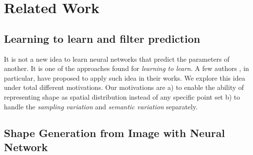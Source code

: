 \section{Related Work}
\subsection{Learning to learn and filter prediction}
It is not a new idea to learn neural networks that predict the parameters of another. It is one of the approaches found for \textit{learning to learn}.  A few authors \cite{schmidhuber1992learning,bertinetto2016learning,jia2016dynamic} , in particular, have proposed to apply such idea in their works. We explore this idea under total different motivations. Our motivations are a) to enable the ability of representing shape as spatial distribution instead of any specific point set b) to handle the \textit{sampling variation} and \textit{semantic variation} separately. 

\subsection{Shape Generation from Image with Neural Network}